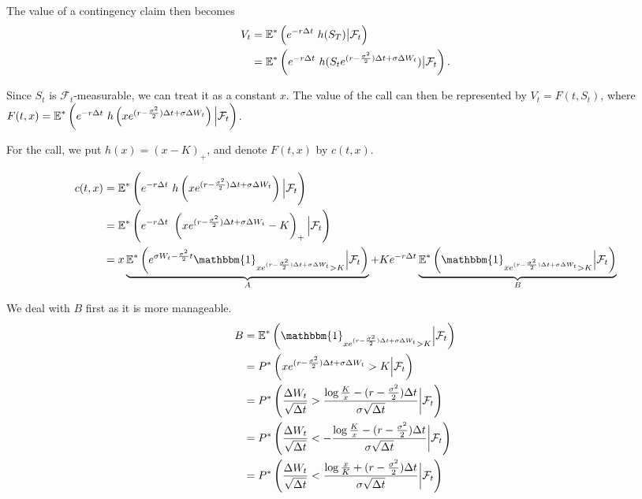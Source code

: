 The value of a contingency claim then becomes
\begin{align*}
	V_t  &=  \operatorname{\mathbb{E}}^* \left( e^{-r \Delta t} \  h(S_T)  \big|  \mathcal{F}_t \right)  \\
	     &=  \operatorname{\mathbb{E}}^* \left( e^{-r \Delta t} \  h(S_t e^{ ( r - \frac{\sigma^2}{2} ) \Delta t + \sigma \Delta W_t })  \big|  \mathcal{F}_t \right) .
\end{align*}

Since $ S_t $ is $ \mathcal{F}_t $-measurable, we can treat it as a constant $ x $. The value of the call can then be represented by $ V_t = F(t, S_t) $, where $ F(t,x) = \operatorname{\mathbb{E}}^* \left( e^{-r \Delta t} \  h \left( x e^{ ( r - \frac{\sigma^2}{2} ) \Delta t + \sigma \Delta W_t } \right)  \Big|  \mathcal{F}_t \right) $.

For the call, we put $ h(x) = (x - K)_+ $, and denote $ F(t, x) $ by $ c(t, x) $.

\begin{align*}
	c(t, x)  &=  \E^* \left( e^{-r \Delta t} \  h \left( x e^{ ( r - \frac{\sigma^2}{2} ) \Delta t + \sigma \Delta W_t } \right)  \Big|  \mathcal{F}_t \right)  \\
	&=  \E^* \left( e^{-r \Delta t} \  \left( x e^{ ( r - \frac{\sigma^2}{2} ) \Delta t + \sigma \Delta W_t } - K  \right)_+  \Big|  \mathcal{F}_t \right)  \\
	&=  x \underbrace{ \E^* \left( e^{ \sigma W_t - \frac{\sigma^2}{2} t }  \mathbbm{1}_{x e^{ ( r - \frac{\sigma^2}{2} ) \Delta t + \sigma \Delta W_t } > K}  \Big|  \mathcal{F}_t \right) }_{A}  +  K e^{-r \Delta t}  \underbrace{ \E^* \left(  \mathbbm{1}_{x e^{ ( r - \frac{\sigma^2}{2} ) \Delta t + \sigma \Delta W_t } > K}  \Big|  \mathcal{F}_t \right) }_{B}
\end{align*}

We deal with $ B $ first as it is more manageable.
\begin{align*}
	B  &=  \E^* \left( \mathbbm{1}_{x e^{ ( r - \frac{\sigma^2}{2} ) \Delta t + \sigma \Delta W_t } > K}  \Big|  \mathcal{F}_t \right)  \\
	&=  P^* \left( x e^{ ( r - \frac{\sigma^2}{2} ) \Delta t + \sigma \Delta W_t } > K  \Big|  \mathcal{F}_t \right)  \\
	&=  P^* \left( \frac{ \Delta W_t }{ \sqrt{\Delta t} }  >  \frac{ \log \frac{K}{x} - ( r - \frac{\sigma^2}{2} ) \Delta t }{ \sigma \sqrt{\Delta t} }  \bigg|  \mathcal{F}_t \right)  \\
	&=  P^* \left( \frac{ \Delta W_t }{ \sqrt{\Delta t} }  <  - \frac{ \log \frac{K}{x} - ( r - \frac{\sigma^2}{2} ) \Delta t }{ \sigma \sqrt{\Delta t} }  \bigg|  \mathcal{F}_t \right)  \\
	&=  P^* \left( \frac{ \Delta W_t }{ \sqrt{\Delta t} }  <  \frac{ \log \frac{x}{K} + ( r - \frac{\sigma^2}{2} ) \Delta t }{ \sigma \sqrt{\Delta t} }  \bigg|  \mathcal{F}_t \right)
\end{align*}

